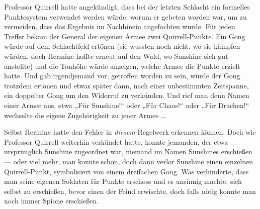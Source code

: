 Professor Quirrell hatte angekündigt, dass bei der letzten Schlacht ein formelles Punktesystem verwendet werden würde, worum er gebeten worden war, um zu vermeiden, dass das Ergebnis im Nachhinein angefochten wurde. Für jeden Treffer bekam der General der eigenen Armee zwei Quirrell-Punkte. Ein Gong würde auf dem Schlachtfeld ertönen (sie wussten noch nicht, wo sie kämpfen würden, doch Hermine hoffte erneut auf den Wald, wo Sunshine sich gut anstellte) und die Tonhöhe würde anzeigen, welche Armee die Punkte erzielt hatte. Und gab irgendjemand vor, getroffen worden zu sein, würde der Gong trotzdem ertönen und etwas später dann, nach einer unbestimmten Zeitspanne, ein doppelter Gong um den Widerruf zu verkünden. Und rief man denn Namen einer Armee aus, etwa
„Für Sunshine!“ oder
„Für Chaos!“ oder
„Für Drachen!“ wechselte die eigene Zugehörigkeit zu jener Armee …

Selbst Hermine hatte den Fehler in \emph{diesem} Regelwerk erkennen können. Doch wie Professor Quirrell weiterhin verkündet hatte, konnte jemanden, der etwa ursprünglich Sunshine zugeordnet war, niemand im Namen Sunshines erschießen — oder viel mehr, man konnte schon, doch dann verlor Sunshine einen einzelnen Quirrell-Punkt, symbolisiert von einem dreifachen Gong. Was verhinderte, dass man seine eigenen Soldaten für Punkte erschoss und es unsinnig machte, sich selbst zu erschießen, bevor einen der Feind erwischte, doch falls nötig konnte man noch immer Spione erschießen.

